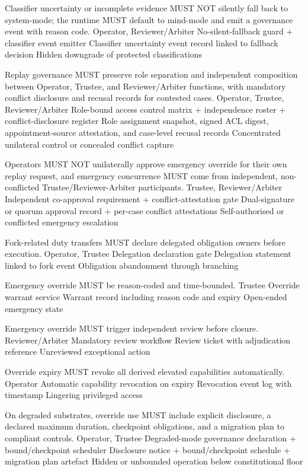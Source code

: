 \documentclass[11pt]{article}
\theoremstyle{definition}
\theoremstyle{plain}
\theoremstyle{remark}
\begin{document}
{Classifier uncertainty or incomplete evidence MUST NOT silently fall back to system-mode; the runtime MUST default to mind-mode and emit a governance event with reason code.}
{Operator, Reviewer/Arbiter}
{No-silent-fallback guard + classifier event emitter}
{Classifier uncertainty event record linked to fallback decision}
{Hidden downgrade of protected classifications}

{Replay governance MUST preserve role separation and independent composition between Operator, Trustee, and Reviewer/Arbiter functions, with mandatory conflict disclosure and recusal records for contested cases.}
{Operator, Trustee, Reviewer/Arbiter}
{Role-bound access control matrix + independence roster + conflict-disclosure register}
{Role assignment snapshot, signed ACL digest, appointment-source attestation, and case-level recusal records}
{Concentrated unilateral control or concealed conflict capture}

{Operators MUST NOT unilaterally approve emergency override for their own replay request, and emergency concurrence MUST come from independent, non-conflicted Trustee/Reviewer-Arbiter participants.}
{Trustee, Reviewer/Arbiter}
{Independent co-approval requirement + conflict-attestation gate}
{Dual-signature or quorum approval record + per-case conflict attestations}
{Self-authorised or conflicted emergency escalation}

{Fork-related duty transfers MUST declare delegated obligation owners before execution.}
{Operator, Trustee}
{Delegation declaration gate}
{Delegation statement linked to fork event}
{Obligation abandonment through branching}

{Emergency override MUST be reason-coded and time-bounded.}
{Trustee}
{Override warrant service}
{Warrant record including reason code and expiry}
{Open-ended emergency state}

{Emergency override MUST trigger independent review before closure.}
{Reviewer/Arbiter}
{Mandatory review workflow}
{Review ticket with adjudication reference}
{Unreviewed exceptional action}

{Override expiry MUST revoke all derived elevated capabilities automatically.}
{Operator}
{Automatic capability revocation on expiry}
{Revocation event log with timestamp}
{Lingering privileged access}

{On degraded substrates, override use MUST include explicit disclosure, a declared maximum duration, checkpoint obligations, and a migration plan to compliant controls.}
{Operator, Trustee}
{Degraded-mode governance declaration + bound/checkpoint scheduler}
{Disclosure notice + bound/checkpoint schedule + migration plan artefact}
{Hidden or unbounded operation below constitutional floor}
\end{document}
